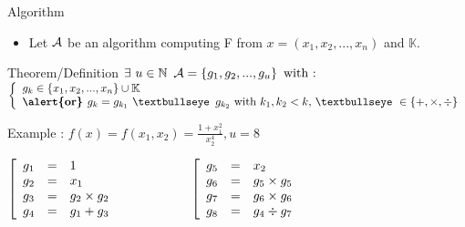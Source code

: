 \begin{frame}{Algorithm}

\begin{itemize}
    \item Let $\mathcal{A}$ be an algorithm computing F from $x = (x_1,x_2,...,x_n)$ and $\mathbb{K}$.
\end{itemize}
    
\begin{block}{Theorem/Definition}
        $
        \exists\,\, u \in \mathbb{N} \,\,\, \mathcal{A} = \left\{ g_1,g_2,...,g_u \right\}
        \textrm{ with :} 
        $
        \hskip 0.3cm
        $
        \left\{
        \begin{array}{l}
        g_k \in \left\{x_1,x_2,...,x_n\right\} \cup \mathbb{K}\\
        \textrm{\textbf{\alert{or} }} g_k = g_{k_1} \textrm{ \textbullseye\, } g_{k_2}\textrm{ with }k_1,k_2 < k \textrm{, \textbullseye }\in \{ +,\times, \div \}
        \end{array}
        \right.
        $
\end{block}

\begin{block}{Example : $f(x) = f(x_1,x_2) = \frac{1+x_1^2}{x_2^4}, u = 8$}

{\centering%
    $
    \left[
    \begin{array}{l c l}
        g_1 & = & 1 \\   
        g_2 & = & x_1 \\   
        g_3 & = & g_2 \times g_2 \\  
        g_4 & = & g_1 + g_3 \\
    \end{array}
    \right.
    \hskip 2cm
    \left[
    \begin{array}{l c l}
        g_5 & = & x_2 \\   
        g_6 & = & g_5 \times g_5 \\   
        g_7 & = & g_6 \times g_6 \\  
        g_8 & = & g_4 \div g_7 \\
    \end{array}
    \right.
    $
}

\end{block}
\end{frame}



